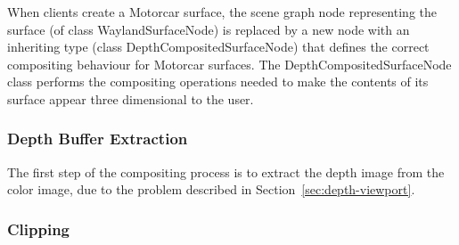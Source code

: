 When clients create a Motorcar surface, the scene graph node representing the surface (of class WaylandSurfaceNode) is replaced by a new node with an inheriting type (class DepthCompositedSurfaceNode)  that defines the correct compositing behaviour for Motorcar surfaces. The DepthCompositedSurfaceNode class performs the compositing operations needed to make the contents of its surface appear three dimensional to the user.

\subsubsection{Depth Buffer Extraction}

The first step of the compositing process is to extract the depth image from the color image, due to the problem described in Section~\ref{sec:depth-viewport}.

\subsubsection{Clipping}
\label{sec:clipping-impl}














